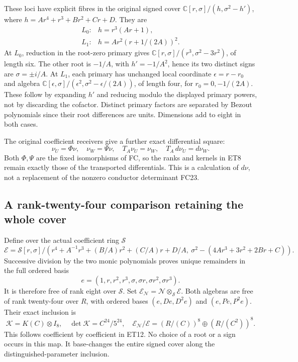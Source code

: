 These loci have explicit fibres in the original signed cover
$\mathbb C[r,\sigma]/(h,\sigma^2-h')$, where
$h=Ar^4+r^3+Br^2+Cr+D$. They are
\[
 \begin{array}{ll}
 L_0:&h=r^3(Ar+1),\\[2pt]
 L_1:&h=Ar^2(r+1/(2A))^2 .
 \end{array}
 \tag{ET9}
\]
At $L_0$, reduction in the root-zero primary gives
$\mathbb C[r,\sigma]/(r^3,\sigma^2-3r^2)$, of length six.
The other root is $-1/A$, with $h'=-1/A^2$, hence its two
distinct signs are $\sigma=\pm i/A$. At $L_1$, each primary
has unchanged local coordinate $\epsilon=r-r_0$ and algebra
$\mathbb C[\epsilon,\sigma]/(\epsilon^2,\sigma^2-\epsilon/(2A))$,
of length four, for $r_0=0,-1/(2A)$. These follow by expanding $h'$
and reducing modulo the displayed primary powers, not by discarding
the cofactor. Distinct primary factors are separated by Bezout
polynomials since their root differences are units. Dimensions add
to eight in both cases.

The original coefficient receivers give a further exact differential
square:
\[
 \nu_U=\Phi\nu,\quad \nu_W=\Psi\nu,\quad
 T_A\nu_U=\nu_W,\quad T_A\,d\nu_U=d\nu_W .
 \tag{ET10}
\]
Both $\Phi,\Psi$ are the fixed isomorphisms of FC, so the ranks and
kernels in ET8 remain exactly those of the transported differentials.
This is a calculation of $d\nu$, not a replacement of the nonzero
conductor determinant FC23.

\subsection{A rank-twenty-four comparison retaining the whole cover}
Define over the actual coefficient ring $\mathscr S$
\[
 \mathscr E=\mathscr S[r,\sigma]/
 \left(r^4+A^{-1}r^3+(B/A)r^2+(C/A)r+D/A,\
       \sigma^2-(4Ar^3+3r^2+2Br+C)\right).
 \tag{ET11}
\]
Successive division by the two monic polynomials proves unique
remainders in the full ordered basis
\[
 e=(1,r,r^2,r^3,\sigma,\sigma r,\sigma r^2,\sigma r^3).
 \tag{ET12}
\]
It is therefore free of rank eight over $\mathscr S$.
Set $\mathscr E_{\mathscr N}=\mathscr N\otimes_{\mathscr S}\mathscr E$.
Both algebras are free of rank twenty-four over $R$, with ordered
bases $(e,De,D^2e)$ and $(e,Pe,P^2e)$. Their exact inclusion is
\[
 \mathcal K=K(C)\otimes I_8,\quad
 \det\mathcal K=C^{24}/5^{24},\quad
 \mathscr E_{\mathscr N}/\mathscr E
 =(R/(C))^8\oplus(R/(C^2))^8 .
 \tag{ET13}
\]
This follows coefficient by coefficient in ET12.
No choice of a root or a sign occurs in this map. It base-changes the
entire signed cover along the distinguished-parameter inclusion.

